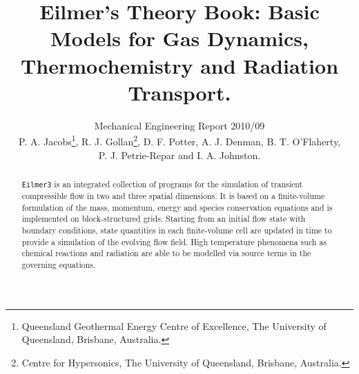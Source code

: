 \documentclass[12pt,a4paper,twoside]{article}
\title{
    Eilmer's Theory Book: Basic Models for Gas Dynamics, Thermochemistry and Radiation Transport.
}
\author{
    Mechanical Engineering Report 2010/09\\
    P. A. Jacobs\thanks{Queensland Geothermal Energy Centre of Excellence, The University of Queensland, Brisbane, Australia.}, 
    R. J. Gollan\thanks{Centre for Hypersonics, The University of Queensland, Brisbane, Australia.},
    D. F. Potter,
    A. J. Denman, B. T. O'Flaherty, \\
    P. J. Petrie-Repar and I. A. Johnston.
}
\begin{document}
\maketitle

\begin{abstract}
\texttt{Eilmer3} is an integrated collection of programs for the simulation of transient
compressible flow in two and three spatial dimensions.
It is based on a finite-volume formulation of the mass, momentum, energy and species conservation equations
and is implemented on block-structured grids.
Starting from an initial flow state with boundary conditions, state quantities in each finite-volume cell 
are updated in time to provide a simulation of the evolving flow field.
High temperature phenomena such as chemical reactions and radiation are able to be modelled via source terms in the governing equations.
\end{abstract}

\clearpage

\tableofcontents

\newpage
\end{document}
